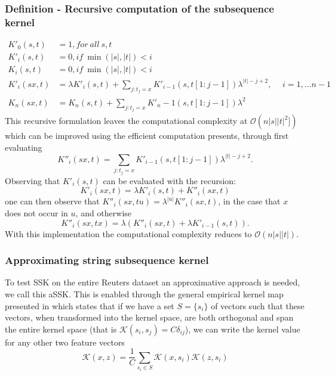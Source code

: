 \subsubsection{Definition - Recursive computation of the subsequence kernel}
\begin{align*}
	K'_{0}(s,t) & = 1, for\ all\ s,t \\
	K'_i(s,t) & = 0, if\ \min(|s|,|t|) < i \\
	K_i(s,t) & = 0, if\ \min(|s|,|t|) < i \\
	K'_i(sx,t) & = \lambda K'_i(s,t) + \sum_{j:t_j=x} K'_{i-1}(s,t[1:j-1])\lambda^{|t|-j+2}, \hspace{15pt} i = 1, \dots n-1 \\	
	K_{n}(sx,t) & = K_n(s,t) + \sum_{j:t_j = x}K'_n-1(s,t[1:j-1])\lambda^2
\end{align*}  
This recursive formulation leaves the computational complexity at $ \mathcal{O}(n|s||t|^2]) $ which can be improved using the efficient computation \cite{lodhi} presents, through first evaluating
\begin{equation*}\label{key}
K''_i(sx,t) = \sum_{j:t_j = x}K'_{i-1}(s,t[1:j-1])\lambda^{|t|-j+2}.
\end{equation*}
Observing that $ K'_i(s,t) $ can be evaluated with the recursion:
\begin{equation*}\label{key}
K'_i(sx,t) = \lambda K'_i(s,t) + K''_i(sx,t)
\end{equation*}
one can then observe that $ K''_i(sx,tu) = \lambda^{|u|}K''_i(sx,t)$, in the case that $ x $ does not occur in $ u $, and otherwise 
\begin{equation*}\label{key}
K''_i(sx,tx) = \lambda \left( K''_i(sx,t) + \lambda K'_{i-1}(s,t) \right).
\end{equation*} 
With this implementation the computational complexity reduces to $ \mathcal{O}(n|s||t|) $.



\subsubsection{Approximating string subsequence kernel}
To test SSK on the entire Reuters dataset an approximative approach is needed, we call this aSSK. This is enabled through the general empirical kernel map presented in \cite{Scholkopf} which states that if we have a set $ S = \{s_i\} $ of vectors such that these vectors, when transformed into the kernel space, are both orthogonal and span the entire kernel space (that is $ \mathcal{K}(s_i,s_j) = C\delta_{ij} $), we can write the kernel value for any other two feature vectors
\begin{equation}\label{eq:kernel_approx}
\mathcal{K}(x,z) = \dfrac{1}{C}\sum_{s_i \in S}\mathcal{K}(x,s_i)\mathcal{K}(z,s_i)
\end{equation}

